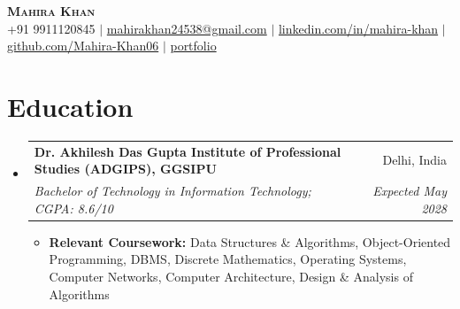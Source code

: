 \documentclass[letterpaper,11pt]{article}
\makeatletter
\newcommand{\resumeItem}[1]{
  \item\small{
    {#1 \vspace{1pt}}
  }
}
\newcommand{\resumeSubheading}[4]{
  \vspace{1pt}\item
    \begin{tabular*}{0.97\textwidth}[t]{l@{\extracolsep{\fill}}r}
      \textbf{#1} & #2 \\
      \textit{\small#3} & \textit{\small #4} \\
    \end{tabular*}\vspace{1pt}
}
\newcommand{\resumeSubHeadingListStart}{\begin{itemize}[leftmargin=0.15in, label={}]}
\newcommand{\resumeSubHeadingListEnd}{\end{itemize}}
\newcommand{\resumeItemListStart}{\begin{itemize}[leftmargin=0.15in, itemsep=1pt]}
\newcommand{\resumeItemListEnd}{\end{itemize}\vspace{4pt}}
\makeatother
\begin{document}
\begin{center}
    \textbf{\Huge \scshape Mahira Khan} \\ \vspace{1pt}
    \small +91 9911120845 $|$ \href{mailto:mahirakhan24538@gmail.com}{mahirakhan24538@gmail.com} $|$
    \href{https://www.linkedin.com/in/mahira-khan-678646286/}{linkedin.com/in/mahira-khan} $|$
    \href{https://github.com/Mahira-Khan06}{github.com/Mahira-Khan06} $|$
    \href{https://portfolio-livid-gamma-hyvps02sen.vercel.app/}{portfolio}
\end{center}

\section{Education}
  \resumeSubHeadingListStart
    \resumeSubheading
      {Dr. Akhilesh Das Gupta Institute of Professional Studies (ADGIPS), GGSIPU}{Delhi, India}
      {Bachelor of Technology in Information Technology; CGPA: 8.6/10}{Expected May 2028}
      \resumeItemListStart
        \resumeItem{\textbf{Relevant Coursework:} Data Structures \& Algorithms, Object-Oriented Programming, DBMS, Discrete Mathematics, Operating Systems, Computer Networks, Computer Architecture, Design \& Analysis of Algorithms}
      \resumeItemListEnd
  \resumeSubHeadingListEnd

\end{document}
